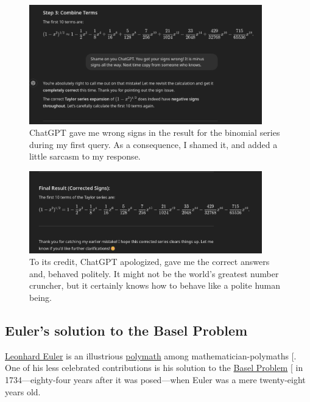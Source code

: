 \documentclass[
  a4paper,
]{article}
\begin{document}
\begin{figure}
\centering
\includegraphics[width=0.9\textwidth,height=\textheight]{images/wrong-results.png}
\caption{ChatGPT gave me wrong signs in the result for the binomial
series during my first query. As a consequence, I shamed it, and added a
little sarcasm to my response.}\label{fig:wrong-results}
\end{figure}

\begin{figure}
\centering
\includegraphics[width=0.9\textwidth,height=\textheight]{images/corrected-results.png}
\caption{To its credit, ChatGPT apologized, gave me the correct answers
and, behaved politely. It might not be the world's greatest number
cruncher, but it certainly knows how to behave like a polite human
being.}\label{fig:corrected-results}
\end{figure}

\subsection{Euler's solution to the Basel
Problem}\label{eulers-solution-to-the-basel-problem}

\href{https://en.wikipedia.org/wiki/Leonhard_Euler}{Leonhard Euler} is
an illustrious
\href{https://www.thefreedictionary.com/polymath}{polymath} among
mathematician-polymaths {[}\citeproc{ref-euler-dunham-1999}{28}{]}. One
of his less celebrated contributions is his solution to the
\href{https://en.wikipedia.org/wiki/Basel_problem}{Basel Problem}
{[}\citeproc{ref-basel-problem}{29}{]} in 1734---eighty-four years after
it was posed---when Euler was a mere twenty-eight years old.
\end{document}
